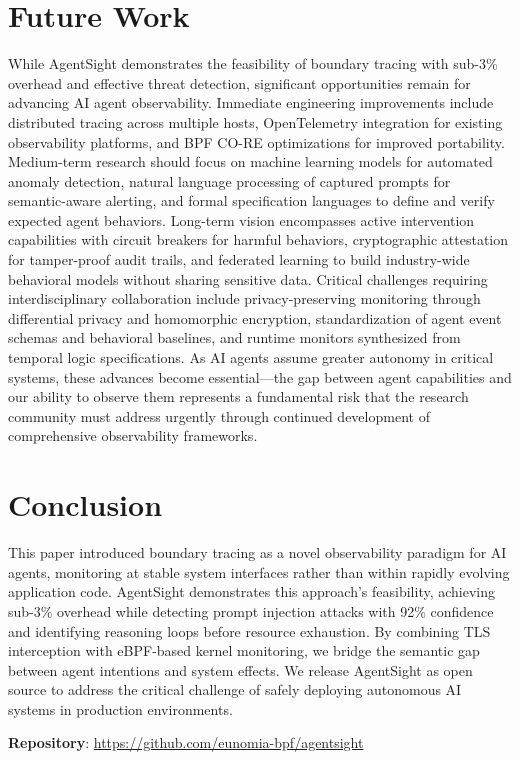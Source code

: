 \section{Future Work}

While AgentSight demonstrates the feasibility of boundary tracing with sub-3\% overhead and effective threat detection, significant opportunities remain for advancing AI agent observability. Immediate engineering improvements include distributed tracing across multiple hosts, OpenTelemetry integration for existing observability platforms, and BPF CO-RE optimizations for improved portability. Medium-term research should focus on machine learning models for automated anomaly detection, natural language processing of captured prompts for semantic-aware alerting, and formal specification languages to define and verify expected agent behaviors. Long-term vision encompasses active intervention capabilities with circuit breakers for harmful behaviors, cryptographic attestation for tamper-proof audit trails, and federated learning to build industry-wide behavioral models without sharing sensitive data. Critical challenges requiring interdisciplinary collaboration include privacy-preserving monitoring through differential privacy and homomorphic encryption, standardization of agent event schemas and behavioral baselines, and runtime monitors synthesized from temporal logic specifications. As AI agents assume greater autonomy in critical systems, these advances become essential—the gap between agent capabilities and our ability to observe them represents a fundamental risk that the research community must address urgently through continued development of comprehensive observability frameworks.


\section{Conclusion}

This paper introduced boundary tracing as a novel observability paradigm for AI agents, monitoring at stable system interfaces rather than within rapidly evolving application code. AgentSight demonstrates this approach's feasibility, achieving sub-3\% overhead while detecting prompt injection attacks with 92\% confidence and identifying reasoning loops before resource exhaustion. By combining TLS interception with eBPF-based kernel monitoring, we bridge the semantic gap between agent intentions and system effects. We release AgentSight as open source to address the critical challenge of safely deploying autonomous AI systems in production environments.

\textbf{Repository}: \url{https://github.com/eunomia-bpf/agentsight}




